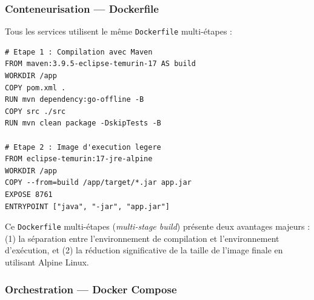 \documentclass[12pt,a4paper]{article}
\begin{document}
\subsubsection{Conteneurisation --- Dockerfile}

Tous les services utilisent le même \texttt{Dockerfile} multi-étapes :

\begin{lstlisting}[style=dockerstyle, caption={Dockerfile commun à tous les services}, label=lst:dockerfile]
# Etape 1 : Compilation avec Maven
FROM maven:3.9.5-eclipse-temurin-17 AS build
WORKDIR /app
COPY pom.xml .
RUN mvn dependency:go-offline -B
COPY src ./src
RUN mvn clean package -DskipTests -B

# Etape 2 : Image d'execution legere
FROM eclipse-temurin:17-jre-alpine
WORKDIR /app
COPY --from=build /app/target/*.jar app.jar
EXPOSE 8761
ENTRYPOINT ["java", "-jar", "app.jar"]
\end{lstlisting}

Ce \texttt{Dockerfile} multi-étapes (\textit{multi-stage build}) présente deux avantages majeurs : (1) la séparation entre l'environnement de compilation et l'environnement d'exécution, et (2) la réduction significative de la taille de l'image finale en utilisant Alpine Linux.

\subsubsection{Orchestration --- Docker Compose}
\end{document}
